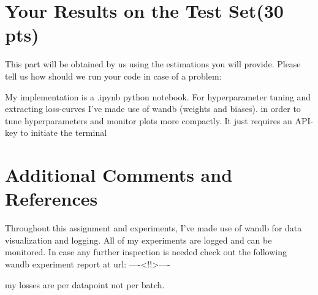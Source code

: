 \documentclass[12pt]{article}
\begin{document}
\section{Your Results on the Test Set(30 pts)}
This part will be obtained by us using the estimations you will provide. Please tell us how should we run your code in case of a problem:

\begin{center}
\raggedright
My implementation is a .ipynb python notebook. For hyperparameter tuning and extracting loss-curves I've made use of wandb (weights and biases).
in order to tune hyperparameters and monitor plots more compactly. It just requires an API-key to initiate the terminal

\end{center}

\section{Additional Comments and References}

Throughout this assignment and experiments, I've made use of wandb for data visualization and logging.
All of my experiments are logged and can be monitored. In case any further inspection is needed check out the following wandb experiment report at url:
----<!!>----

my losses are per datapoint not per batch.
\end{document}
